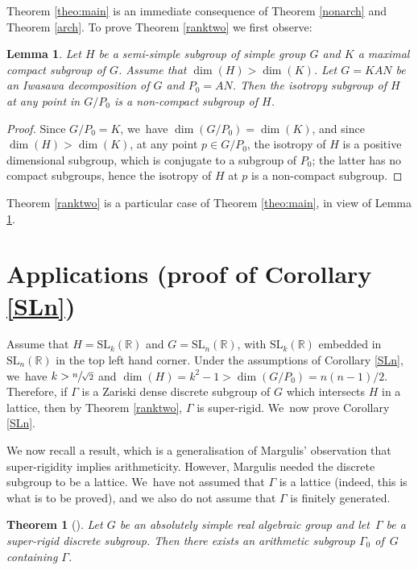 \documentclass[JEP,XML,SOM,Unicode,published]{cedram}
\newtheorem{theorem}{Theorem}
\newtheorem{lemma}{Lemma}
\theoremstyle{definition}
\newcommand{\field}[1]{\mathbb{#1}}
\newcommand{\R}{\field{R}}
\newcommand{\SL}{\mathrm{SL}}
\begin{document}
Theorem \ref{theo:main} is an immediate consequence of Theorem \ref{nonarch} and Theorem \ref{arch}.
To prove Theorem \ref{ranktwo} we first observe:

\begin{lemma}\label{trick} Let $H$ be a semi-simple subgroup of simple
group $G$ and $K$ a maximal compact subgroup of $G$. Assume that
$\dim(H)>\dim(K)$. Let $G=KAN$ be an Iwasawa decomposition of $G$ and
$P_0=AN$. Then the isotropy subgroup of $H$ at any point in $G/P_0$ is
a non-compact subgroup of $H$.
\end{lemma}

\begin{proof} Since $G/P_0=K$, we~have $\dim(G/P_0)=\dim(K)$, and since
$\dim(H)>\dim(K)$, at any point $p\in G/P_0$, the isotropy of $H$ is a
positive dimensional subgroup, which is conjugate to a subgroup of
$P_0$; the latter has no compact subgroups, hence the isotropy of $H$
at $p$ is a non-compact subgroup.
\end{proof}

Theorem \ref{ranktwo} is a particular case of Theorem \ref{theo:main}, in view of Lemma \ref{trick}.

\section{Applications (proof of Corollary \ref{SLn})}

Assume that $H=\SL_k(\R)$ and $G=\SL_n(\R)$, with $\SL_k(\R)$ embedded in $\SL_n(\R)$ in the top left hand corner. Under the assumptions of Corollary \ref{SLn}, we~have $k >\sfrac{n}{\sqrt{2}}$ and $\dim (H)=k^2-1> \dim
(G/P_0)=n(n-1)/2$. Therefore, if $\Gamma$ is a Zariski dense discrete
subgroup of $G$ which intersects $H$ in a lattice, then by Theorem
\ref{ranktwo}, $\Gamma $ is super-rigid. We~now prove Corollary
\ref{SLn}.

We now recall a result, which is a generalisation of Margulis' observation that super-rigidity implies arithmeticity. However, Margulis needed the discrete subgroup to be a lattice. We~have not assumed that $\Gamma$ is a lattice (indeed, this is what is to be proved), and we also do not assume that $\Gamma $ is finitely generated.

\begin{theorem}[\cite{V3}]\label{arithmetic} Let $G$ be an absolutely simple real algebraic group and let~$\Gamma $ be a
super-rigid discrete subgroup. Then there exists an arithmetic subgroup $\Gamma_0$ of~$G$ containing $\Gamma$.
\end{theorem}
\end{document}
